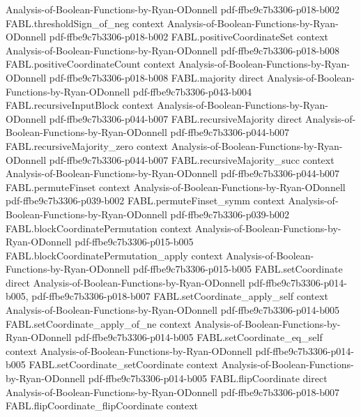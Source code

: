 \begin{theorem}
  {Analysis-of-Boolean-Functions-by-Ryan-ODonnell}
  {pdf-ffbe9c7b3306-p018-b002}
\proofstep
  {FABL.thresholdSign_of_neg}
  {context}
  {Analysis-of-Boolean-Functions-by-Ryan-ODonnell}
  {pdf-ffbe9c7b3306-p018-b002}
\proofstep
  {FABL.positiveCoordinateSet}
  {context}
  {Analysis-of-Boolean-Functions-by-Ryan-ODonnell}
  {pdf-ffbe9c7b3306-p018-b008}
\proofstep
  {FABL.positiveCoordinateCount}
  {context}
  {Analysis-of-Boolean-Functions-by-Ryan-ODonnell}
  {pdf-ffbe9c7b3306-p018-b008}
\proofstep
  {FABL.majority}
  {direct}
  {Analysis-of-Boolean-Functions-by-Ryan-ODonnell}
  {pdf-ffbe9c7b3306-p043-b004}
\proofstep
  {FABL.recursiveInputBlock}
  {context}
  {Analysis-of-Boolean-Functions-by-Ryan-ODonnell}
  {pdf-ffbe9c7b3306-p044-b007}
\proofstep
  {FABL.recursiveMajority}
  {direct}
  {Analysis-of-Boolean-Functions-by-Ryan-ODonnell}
  {pdf-ffbe9c7b3306-p044-b007}
\proofstep
  {FABL.recursiveMajority_zero}
  {context}
  {Analysis-of-Boolean-Functions-by-Ryan-ODonnell}
  {pdf-ffbe9c7b3306-p044-b007}
\proofstep
  {FABL.recursiveMajority_succ}
  {context}
  {Analysis-of-Boolean-Functions-by-Ryan-ODonnell}
  {pdf-ffbe9c7b3306-p044-b007}
\proofstep
  {FABL.permuteFinset}
  {context}
  {Analysis-of-Boolean-Functions-by-Ryan-ODonnell}
  {pdf-ffbe9c7b3306-p039-b002}
\proofstep
  {FABL.permuteFinset_symm}
  {context}
  {Analysis-of-Boolean-Functions-by-Ryan-ODonnell}
  {pdf-ffbe9c7b3306-p039-b002}
\proofstep
  {FABL.blockCoordinatePermutation}
  {context}
  {Analysis-of-Boolean-Functions-by-Ryan-ODonnell}
  {pdf-ffbe9c7b3306-p015-b005}
\proofstep
  {FABL.blockCoordinatePermutation_apply}
  {context}
  {Analysis-of-Boolean-Functions-by-Ryan-ODonnell}
  {pdf-ffbe9c7b3306-p015-b005}
\proofstep
  {FABL.setCoordinate}
  {direct}
  {Analysis-of-Boolean-Functions-by-Ryan-ODonnell}
  {pdf-ffbe9c7b3306-p014-b005,
    pdf-ffbe9c7b3306-p018-b007}
\proofstep
  {FABL.setCoordinate_apply_self}
  {context}
  {Analysis-of-Boolean-Functions-by-Ryan-ODonnell}
  {pdf-ffbe9c7b3306-p014-b005}
\proofstep
  {FABL.setCoordinate_apply_of_ne}
  {context}
  {Analysis-of-Boolean-Functions-by-Ryan-ODonnell}
  {pdf-ffbe9c7b3306-p014-b005}
\proofstep
  {FABL.setCoordinate_eq_self}
  {context}
  {Analysis-of-Boolean-Functions-by-Ryan-ODonnell}
  {pdf-ffbe9c7b3306-p014-b005}
\proofstep
  {FABL.setCoordinate_setCoordinate}
  {context}
  {Analysis-of-Boolean-Functions-by-Ryan-ODonnell}
  {pdf-ffbe9c7b3306-p014-b005}
\proofstep
  {FABL.flipCoordinate}
  {direct}
  {Analysis-of-Boolean-Functions-by-Ryan-ODonnell}
  {pdf-ffbe9c7b3306-p018-b007}
\proofstep
  {FABL.flipCoordinate_flipCoordinate}
  {context}

\end{theorem}
